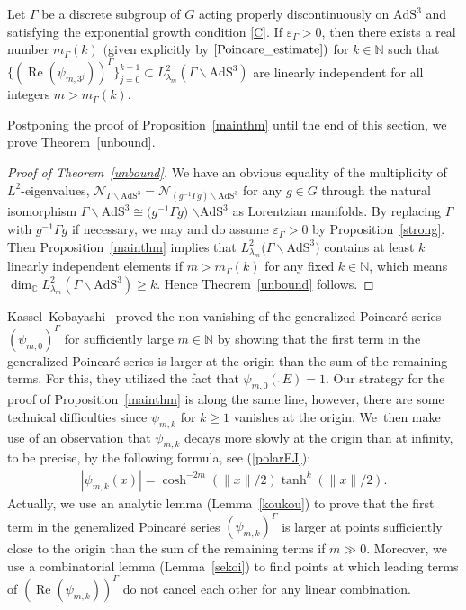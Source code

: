 \begin{Proposition}
\label{mainthm}
Let $\Gamma$ be a discrete subgroup of $G$ acting properly discontinuously
on $\mathrm{AdS}^{3}$
and satisfying the exponential growth condition \eqref{C}.
If $\varepsilon_{\Gamma}>0$,
then there exists a real number $m_{\Gamma}(k)$
$($given explicitly by $\eqref{Poincare_estimate})$
for $k\in \mathbb{N}$
such that
$\{(\operatorname{Re}(\psi_{m,3^{j}}))^{\Gamma}\}_{j=0}^{k-1}
\subset L^2_{\lambda_{m}}(\Gamma\backslash\mathrm{AdS}^{3})$
are linearly independent
for all integers $m > m_{\Gamma}(k)$.
\end{Proposition}

Postponing the proof of Proposition~\ref{mainthm} until the end of this section,
we prove Theorem~\ref{unbound}.

\begin{proof}[Proof of Theorem~\ref{unbound}]
We have an obvious equality of the multiplicity of $L^2$-eigenvalues,
$\mathcal{N}_{\Gamma\backslash\mathrm{AdS}^{3}} =
\mathcal{N}_{(g^{-1}\Gamma g)\backslash\mathrm{AdS}^{3}}$
for any $g\in G$
through the natural isomorphism
$\Gamma\backslash\mathrm{AdS}^{3} \cong
\big(g^{-1}\Gamma g\big)$ $\backslash\mathrm{AdS}^{3}$ as Lorentzian manifolds.
By replacing $\Gamma$ with $g^{-1}\Gamma g$ if necessary,
we may and do assume $\varepsilon_{\Gamma}>0$ by Proposition~\ref{strong}.
Then Proposition~\ref{mainthm} implies that
$L^2_{\lambda_{m}}\big(\Gamma\backslash \mathrm{AdS}^{3}\big)$ contains at least
$k$ linearly independent elements
if $m>m_{\Gamma}(k)$ for any fixed $k\in\mathbb{N}$,
which means
$\dim_{\mathbb{C}} L^2_{\lambda_{m}}(\Gamma\backslash\mathrm{AdS}^{3})
\geq k.$
Hence Theorem~\ref{unbound} follows.
\end{proof}

Kassel--Kobayashi~\cite{KaKob16} proved the non-vanishing of
the generalized Poincar\'e series $(\psi_{m,0})^{\Gamma}$
for sufficiently large $m\in\mathbb{N}$
by showing that the first term in the generalized Poincar\'e series
is larger at the origin than the sum of the remaining terms.
For this, they utilized the fact that $\psi_{m,0}(\grave{\ }E)=1$.
Our strategy for the proof of Proposition~\ref{mainthm} is along the same line,
however, there are some technical difficulties
since $\psi_{m,k}$ for $k\geq1$ vanishes at the origin. We~then make use of an observation that
$\psi_{m,k}$ decays more slowly at the origin than at infinity,
to be precise, by the following formula, see (\ref{polarFJ}):
\begin{gather*}
|\psi_{m,k}(x)|=\cosh^{-2m}(\|x\|/2) \tanh^{k}(\|x\|/2).
\end{gather*}
Actually, we use an analytic lemma (Lemma~\ref{koukou})
to prove that the first term in the generalized Poincar\'e series $(\psi_{m,k})^{\Gamma}$
is larger at points sufficiently close to the origin
than the sum of the remaining terms if $m\gg0$.
Moreover,
we use a combinatorial lemma (Lemma~\ref{sekoi})
to find points at which
leading terms of
$(\operatorname{Re}(\psi_{m,k}))^{\Gamma}$
do not cancel each other for any linear combination.

